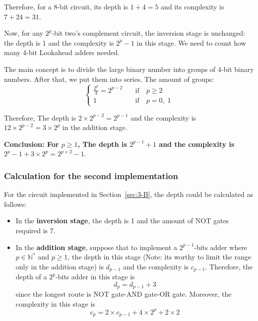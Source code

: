\documentclass[conference]{IEEEtran}
\begin{document}
Therefore, for a 8-bit circuit, its depth is $1+4=5$ and its complexity is $7+24=31$.

Now, for any $2^p$-bit two's complement circuit, the inversion stage is unchanged: the depth is 1 and the complexity is $2^p-1$ in this stage. We need to count how many 4-bit Lookahead adders needed.

The main concept is to divide the large binary number into groups of 4-bit binary numbers. After that, we put them into series. The amount of groups: 
\begin{equation}
    \begin{cases}
        \frac{2^p}{4} = 2^{p-2} \quad &\text{if} \quad p \geq 2     \\
        1 &\text{if} \quad  p = 0, \; 1
    \end{cases}
\end{equation}

Therefore, The depth is $2\times 2^{p-2} = 2 ^{p-1}$ and the complexity is $12 \times 2^{p-2} = 3 \times 2^p$ in the addition stage.


\textbf{Conclusion: For $p \geq 1$, The depth is $2^{p-1} + 1$ and the complexity is $2^p - 1 + 3 \times 2^p = 2^{p+2}-1$}.


\subsubsection{Calculation for the second implementation}\label{sec:q4-2}

For the circuit implemented in Section~\ref{sec:3-B}, the depth could be calculated as follows:

\begin{itemize}
    \item In the \textbf{inversion stage}, the depth is 1 and the amount of NOT gates required is 7.
    \item In the \textbf{addition stage}, suppose that to implement a $2^{p-1}$-bits adder where $p \in \mathbb{N}^*$ and $p \geq 1$, the depth in this stage (Note: its worthy to limit the range only in the addition stage) is $d_{p-1}$ and the complexity is $c_{p-1}$. 
    Therefore, the depth of a $2^p$-bits adder in this stage is 
    \begin{equation}
        d_p = d_{p-1} + 3
    \end{equation}
    since the longest route is NOT gate-AND gate-OR gate.
    Moreover, the complexity in this stage is
    \begin{equation}\label{eq:complexity}
        c_p = 2 \times c_{p-1} + 4 \times 2^p + 2 \times 2
    \end{equation}
\end{itemize}
\end{document}
